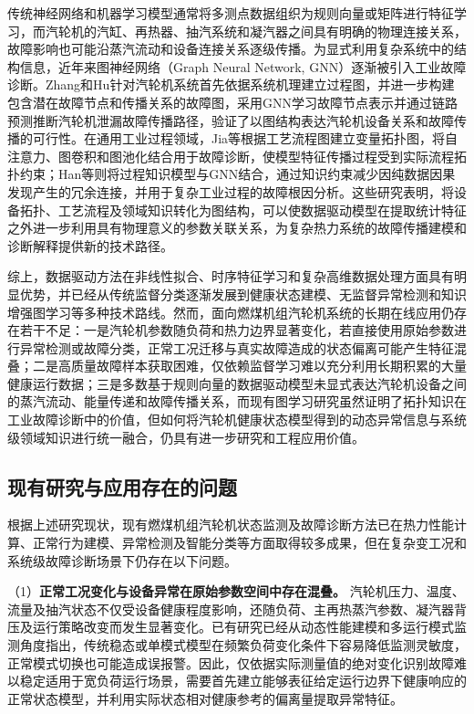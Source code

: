 传统神经网络和机器学习模型通常将多测点数据组织为规则向量或矩阵进行特征学习，而汽轮机的汽缸、再热器、抽汽系统和凝汽器之间具有明确的物理连接关系，故障影响也可能沿蒸汽流动和设备连接关系逐级传播。为显式利用复杂系统中的结构信息，近年来图神经网络（Graph Neural Network, GNN）逐渐被引入工业故障诊断。Zhang和Hu针对汽轮机系统首先依据系统机理建立过程图，并进一步构建包含潜在故障节点和传播关系的故障图，采用GNN学习故障节点表示并通过链路预测推断汽轮机泄漏故障传播路径，验证了以图结构表达汽轮机设备关系和故障传播的可行性\cite{ZhangHu2021FaultPropagationGNN}。在通用工业过程领域，Jia等根据工艺流程图建立变量拓扑图，将自注意力、图卷积和图池化结合用于故障诊断，使模型特征传播过程受到实际流程拓扑约束\cite{Jia2023TopologyGuidedGraph}；Han等则将过程知识模型与GNN结合，通过知识约束减少因纯数据因果发现产生的冗余连接，并用于复杂工业过程的故障根因分析\cite{Han2022KnowledgeEnhancedGNN}。这些研究表明，将设备拓扑、工艺流程及领域知识转化为图结构，可以使数据驱动模型在提取统计特征之外进一步利用具有物理意义的参数关联关系，为复杂热力系统的故障传播建模和诊断解释提供新的技术路径。

综上，数据驱动方法在非线性拟合、时序特征学习和复杂高维数据处理方面具有明显优势，并已经从传统监督分类逐渐发展到健康状态建模、无监督异常检测和知识增强图学习等多种技术路线。然而，面向燃煤机组汽轮机系统的长期在线应用仍存在若干不足：一是汽轮机参数随负荷和热力边界显著变化，若直接使用原始参数进行异常检测或故障分类，正常工况迁移与真实故障造成的状态偏离可能产生特征混叠\cite{Li2021LSTMStageWarning,Chen2023AdaptiveTransfer}；二是高质量故障样本获取困难，仅依赖监督学习难以充分利用长期积累的大量健康运行数据\cite{Ko2022DynamicThresholdAE,Chen2023AdaptiveTransfer}；三是多数基于规则向量的数据驱动模型未显式表达汽轮机设备之间的蒸汽流动、能量传递和故障传播关系，而现有图学习研究虽然证明了拓扑知识在工业故障诊断中的价值\cite{ZhangHu2021FaultPropagationGNN,Jia2023TopologyGuidedGraph,Han2022KnowledgeEnhancedGNN}，但如何将汽轮机健康状态模型得到的动态异常信息与系统级领域知识进行统一融合，仍具有进一步研究和工程应用价值。

\subsection{现有研究与应用存在的问题}

根据上述研究现状，现有燃煤机组汽轮机状态监测及故障诊断方法已在热力性能计算、正常行为建模、异常检测及智能分类等方面取得较多成果，但在复杂变工况和系统级故障诊断场景下仍存在以下问题。

（1）\textbf{正常工况变化与设备异常在原始参数空间中存在混叠。} 汽轮机压力、温度、流量及抽汽状态不仅受设备健康程度影响，还随负荷、主再热蒸汽参数、凝汽器背压及运行策略改变而发生显著变化。已有研究已经从动态性能建模和多运行模式监测角度指出，传统稳态或单模式模型在频繁负荷变化条件下容易降低监测灵敏度，正常模式切换也可能造成误报警\cite{Li2021LSTMStageWarning,Chen2023AdaptiveTransfer}。因此，仅依据实际测量值的绝对变化识别故障难以稳定适用于宽负荷运行场景，需要首先建立能够表征给定运行边界下健康响应的正常状态模型，并利用实际状态相对健康参考的偏离量提取异常特征。

